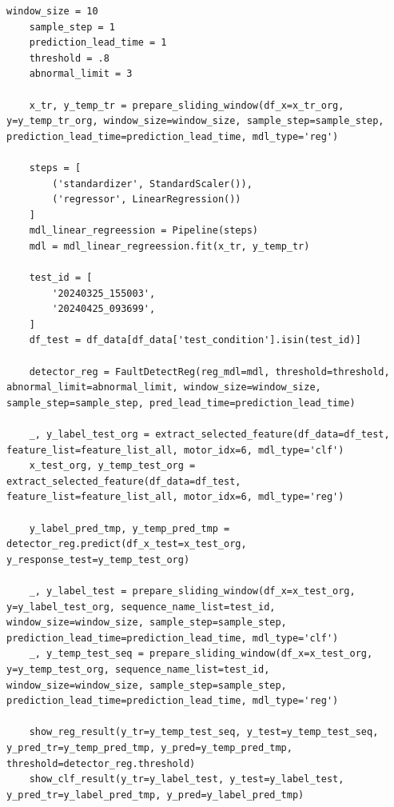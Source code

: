 \documentclass[11pt,a4paper]{article}
\begin{document}
\begin{lstlisting}[style=pyfull]
    window_size = 10
    sample_step = 1
    prediction_lead_time = 1
    threshold = .8
    abnormal_limit = 3

    x_tr, y_temp_tr = prepare_sliding_window(df_x=x_tr_org, y=y_temp_tr_org, window_size=window_size, sample_step=sample_step, prediction_lead_time=prediction_lead_time, mdl_type='reg')

    steps = [
        ('standardizer', StandardScaler()),
        ('regressor', LinearRegression())
    ]
    mdl_linear_regreession = Pipeline(steps)
    mdl = mdl_linear_regreession.fit(x_tr, y_temp_tr)

    test_id = [
        '20240325_155003',
        '20240425_093699',
    ]
    df_test = df_data[df_data['test_condition'].isin(test_id)]

    detector_reg = FaultDetectReg(reg_mdl=mdl, threshold=threshold, abnormal_limit=abnormal_limit, window_size=window_size, sample_step=sample_step, pred_lead_time=prediction_lead_time)

    _, y_label_test_org = extract_selected_feature(df_data=df_test, feature_list=feature_list_all, motor_idx=6, mdl_type='clf')
    x_test_org, y_temp_test_org = extract_selected_feature(df_data=df_test, feature_list=feature_list_all, motor_idx=6, mdl_type='reg')

    y_label_pred_tmp, y_temp_pred_tmp = detector_reg.predict(df_x_test=x_test_org, y_response_test=y_temp_test_org)

    _, y_label_test = prepare_sliding_window(df_x=x_test_org, y=y_label_test_org, sequence_name_list=test_id, window_size=window_size, sample_step=sample_step, prediction_lead_time=prediction_lead_time, mdl_type='clf')
    _, y_temp_test_seq = prepare_sliding_window(df_x=x_test_org, y=y_temp_test_org, sequence_name_list=test_id, window_size=window_size, sample_step=sample_step, prediction_lead_time=prediction_lead_time, mdl_type='reg')

    show_reg_result(y_tr=y_temp_test_seq, y_test=y_temp_test_seq, y_pred_tr=y_temp_pred_tmp, y_pred=y_temp_pred_tmp, threshold=detector_reg.threshold)
    show_clf_result(y_tr=y_label_test, y_test=y_label_test, y_pred_tr=y_label_pred_tmp, y_pred=y_label_pred_tmp)
\end{lstlisting}
\end{document}
